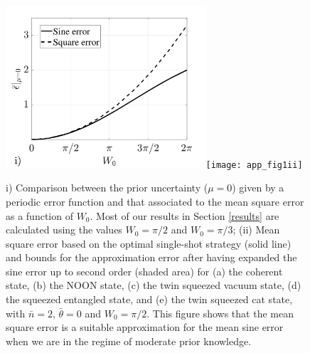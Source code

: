 \begin{figure}[t]
\centering
\includegraphics[trim={0.1cm 0.1cm 1.4cm 0.2cm},clip,width=7.45cm]{pictures/app_fig1i}\texttt{[image: app\_fig1ii]}
	\caption[Square error as an approximation for a periodic uncertainty]{i) Comparison between the prior uncertainty ($\mu = 0$) given by a periodic error function and that associated to the mean square error as a function of $W_0$. Most of our results in Section \ref{results} are calculated using the values $W_0 = \pi/2$ and $W_0 = \pi/3$; (ii) Mean square error based on the optimal single-shot strategy (solid line) and bounds for the approximation error after having expanded the sine error up to second order (shaded area) for (a) the coherent state, (b) the NOON state, (c) the twin squeezed vacuum state, (d) the squeezed entangled state, and (e) the twin squeezed cat state, with $\bar{n} = 2$, $\bar{\theta}=0$ and $W_0 = \pi/2$. This figure shows that the mean square error is a suitable approximation for the mean sine error when we are in the regime of moderate prior knowledge.}
\label{circular_mse}
\end{figure}


